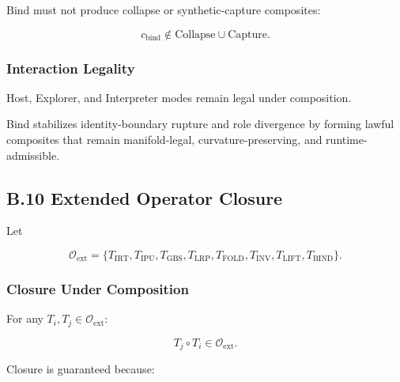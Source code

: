 Bind must not produce collapse or synthetic-capture composites:



\[
c_{\mathrm{bind}} \notin \text{Collapse} \cup \text{Capture}.
\]



\subsubsection*{Interaction Legality}

Host, Explorer, and Interpreter modes remain legal under composition.

\medskip

\noindent Bind stabilizes identity-boundary rupture and role divergence by
forming lawful composites that remain manifold-legal, curvature-preserving, and
runtime-admissible.


\subsection*{B.10 Extended Operator Closure}

\noindent Let



\[
\mathcal{O}_{\mathrm{ext}} =
\{T_{\mathrm{IRT}}, T_{\mathrm{IPU}}, T_{\mathrm{GBS}}, T_{\mathrm{LRP}},
  T_{\mathrm{FOLD}}, T_{\mathrm{INV}}, T_{\mathrm{LIFT}}, T_{\mathrm{BIND}}\}.
\]



\subsubsection*{Closure Under Composition}

For any $T_i, T_j \in \mathcal{O}_{\mathrm{ext}}$:



\[
T_j \circ T_i \in \mathcal{O}_{\mathrm{ext}}.
\]



\noindent Closure is guaranteed because:

